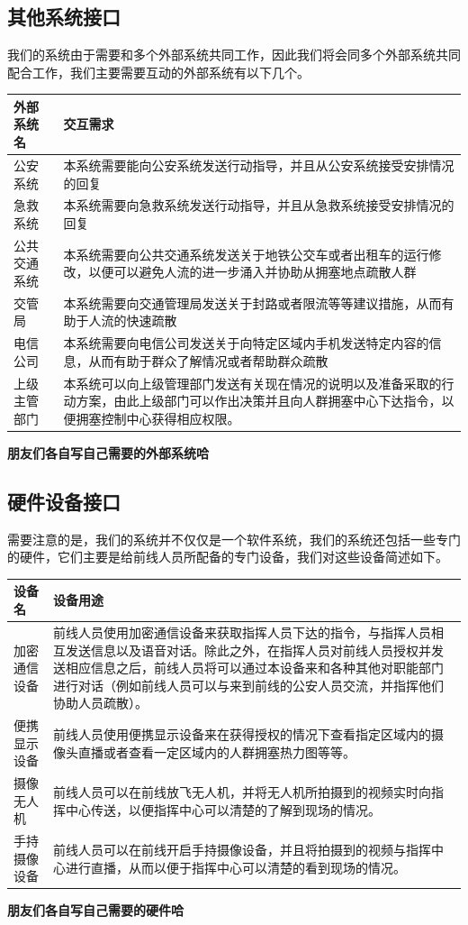 \documentclass{ctexrep}
\begin{document}
\subsection{其他系统接口}
我们的系统由于需要和多个外部系统共同工作，因此我们将会同多个外部系统共同配合工作，我们主要需要互动的外部系统有以下几个。
\begin{longtable}{p{2cm}|p{10cm}}
\hline
外部系统名 & 交互需求 \\
\hline
\hline
公安系统 & 本系统需要能向公安系统发送行动指导，并且从公安系统接受安排情况的回复 \\
\hline
急救系统 & 本系统需要向急救系统发送行动指导，并且从急救系统接受安排情况的回复 \\
\hline
公共交通系统 & 本系统需要向公共交通系统发送关于地铁公交车或者出租车的运行修改，以便可以避免人流的进一步涌入并协助从拥塞地点疏散人群 \\
\hline
交管局 & 本系统需要向交通管理局发送关于封路或者限流等等建议措施，从而有助于人流的快速疏散\\
\hline
电信公司 & 本系统需要向电信公司发送关于向特定区域内手机发送特定内容的信息，从而有助于群众了解情况或者帮助群众疏散 \\
\hline
上级主管部门 & 本系统可以向上级管理部门发送有关现在情况的说明以及准备采取的行动方案，由此上级部门可以作出决策并且向人群拥塞中心下达指令，以便拥塞控制中心获得相应权限。\\
\hline
\end{longtable}
\textbf{朋友们各自写自己需要的外部系统哈}

\subsection{硬件设备接口}
需要注意的是，我们的系统并不仅仅是一个软件系统，我们的系统还包括一些专门的硬件，它们主要是给前线人员所配备的专门设备，我们对这些设备简述如下。
\begin{longtable}{p{2cm}|p{10cm}}
\hline
设备名 & 设备用途 \\
\hline
\hline
加密通信设备 & 前线人员使用加密通信设备来获取指挥人员下达的指令，与指挥人员相互发送信息以及语音对话。除此之外，在指挥人员对前线人员授权并发送相应信息之后，前线人员将可以通过本设备来和各种其他对职能部门进行对话（例如前线人员可以与来到前线的公安人员交流，并指挥他们协助人员疏散）。 \\
\hline
便携显示设备 & 前线人员使用便携显示设备来在获得授权的情况下查看指定区域内的摄像头直播或者查看一定区域内的人群拥塞热力图等等。 \\
\hline
摄像无人机 & 前线人员可以在前线放飞无人机，并将无人机所拍摄到的视频实时向指挥中心传送，以便指挥中心可以清楚的了解到现场的情况。 \\
\hline
手持摄像设备 & 前线人员可以在前线开启手持摄像设备，并且将拍摄到的视频与指挥中心进行直播，从而以便于指挥中心可以清楚的看到现场的情况。 \\
\hline
\end{longtable}
\textbf{朋友们各自写自己需要的硬件哈}
\end{document}
